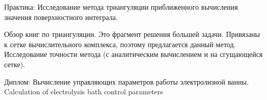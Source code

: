 \documentclass{article}
\begin{document}
Практика:
Исследование метода триангуляции приближенного вычисления значения поверхностного интеграла.

Обзор книг по триангуляции.
Это фрагмент решения большей задачи. Привязаны к сетке вычислительного комплекса, поэтому предлагается данный метод.
Исследование точности метода (с аналитическим вычислением и на сгущающейся сетке).

Диплом:
Вычисление управляющих параметров работы электролизной ванны.
Calculation of electrolysis bath control parameters
\end{document}
